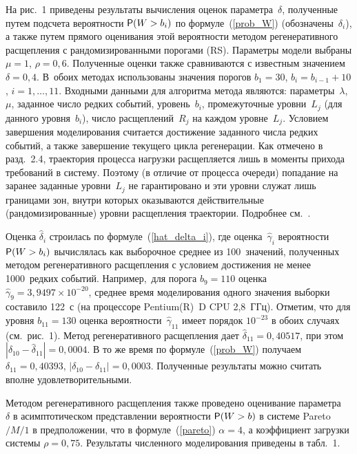 \begin{multicols}{2}
\noindent
На рис.~1 приведены  результаты  вычисления оценок
параметра~$\delta$, полученные путем  подсчета   ве\-ро\-ят\-ности ${\sf P}
(W > b_i)$ по формуле~(\ref{prob_W})  (обозначены~$\delta_i$), а
также путем прямого  оценивания  этой вероятности методом
регенеративного расщепления с рандомизированными порогами (RS).
Параметры модели выбраны  $\mu=1$,  $\rho=0{,}6$. Полученные оценки
также сравниваются  с известным значением $\delta=0{,}4$. В~обоих
методах использованы значения  порогов $ b_1 = 30$, $b_i =
b_{i-1}+10$,  $i = 1, \dots, 11$. 
 Входными данными для алгоритма метода являются:
параметры~$\lambda$, $\mu$, заданное число редких событий, уровень~$b_i$, 
промежуточные уровни~$L_j$ (для данного уровня~$b_i$), чис\-ло
расщеплений~$R_j$ на каждом уровне~$L_j$. Условием завершения
моделирования считается достижение заданного  числа редких событий,
а также завершение текущего  цикла регенерации. Как отмечено в
разд.~2.4, траектория процесса нагрузки расщепляется лишь в
моменты прихода требований в систему. Поэтому  (в отличие от
процесса очереди) попадание на заранее заданные уровни~$L_j$  не
гарантировано и эти уровни  служат лишь границами зон, внутри
которых оказываются действительные (рандомизированные) уровни
расщепления траектории. Подробнее см.~\cite {avb4, diss_2008}.

Оценка $\hat\delta_i$ строилась по формуле~(\ref{hat_delta_i}), где
оценка~$\hat\gamma_i$ вероятности ${\sf P} (W > b_i)$ вычислялась как
выборочное среднее из 100~значений, полученных методом
регенеративного расщепления с условием достижения не менее 1000~редких событий. 
Например,\ для порога $b_9=110$ оценка $\hat\gamma_9 = 3{,}9497\times 10^{-20}$, 
среднее время моделирования одного
значения выборки составило 122~с (на процессоре Pentium(R)~D
CPU 2,8~ГГц).
 Отметим, что
для  уровня $b_{11}= 130$  оценка вероятности~$\hat\gamma_{11}$
имеет порядок $10^{-23}$ в  обоих случаях (см.\ рис.~1). Метод
регенеративного расщепления дает $\hat\delta_{11} = 0{,}40517$, при
этом $|\hat\delta_{10} - \hat\delta_{11}| = 0{,}0004$. В то же время
по  формуле~(\ref{prob_W}) получаем  $\delta_{11}=0{,}40393$,
$|\delta_{10}-\delta_{11}| = 0{,}0003$.  Полученные результаты можно
считать вполне удовлетворительными.

Методом регенеративного расщепления также проведено  оценивание
параметра~ $\delta$ в асимптотическом пред\-став\-ле\-нии вероятности ${\sf P}
(W > b)$ в системе
Pareto$/M/1$ в предположении, что  в формуле~(\ref{pareto}) $\alpha
= 4$, а коэффициент загрузки  системы $\rho = 0{,}75$. Результаты
численного моделирования приведены в табл.~1.


\end{multicols}
